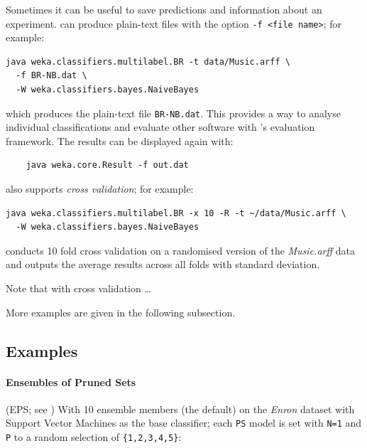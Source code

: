 \documentclass[11pt]{article}
\newcommand{\MEKA}{Meka}
\begin{document}
Sometimes it can be useful to save predictions and information about an experiment. \framework{\MEKA} can produce plain-text files with the option \texttt{-f <file name>}; for example:
\begin{verbatim}
java weka.classifiers.multilabel.BR -t data/Music.arff \ 
  -f BR-NB.dat \
  -W weka.classifiers.bayes.NaiveBayes
\end{verbatim}
which produces the plain-text file \texttt{BR-NB.dat}. This provides a way to analyse individual classifications and evaluate other software with \framework{\MEKA}'s evaluation framework. The results can be displayed again with:
\begin{verbatim}
	java weka.core.Result -f out.dat 
\end{verbatim}

\framework{\MEKA} also supports \emph{cross validation}; for example:
\begin{verbatim}
java weka.classifiers.multilabel.BR -x 10 -R -t ~/data/Music.arff \
  -W weka.classifiers.bayes.NaiveBayes
\end{verbatim}
conducts 10 fold cross validation on a randomised version of the \textit{Music.arff} data and outputs the average results across all folds with standard deviation. %

{\blue Note that with cross validation \ldots}

More examples are given in the following subsection.

\subsection{Examples} 



\paragraph{Ensembles of Pruned Sets} (EPS; see \cite{EPS}) With 10 ensemble members (the default) on the \textit{Enron} dataset with Support Vector Machines as the base classifier; each \texttt{PS} model is set with \texttt{N=1} and \texttt{P} to a random selection of \texttt{\{1,2,3,4,5\}}:
\end{document}
